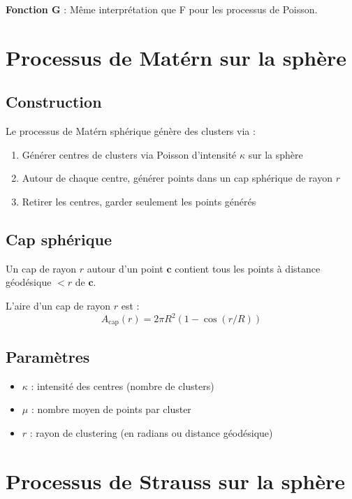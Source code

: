 \textbf{Fonction G} : Même interprétation que F pour les processus de Poisson.

\section{Processus de Matérn sur la sphère}

\subsection{Construction}

Le processus de Matérn sphérique génère des clusters via :

\begin{enumerate}
    \item Générer centres de clusters via Poisson d'intensité $\kappa$ sur la sphère
    \item Autour de chaque centre, générer points dans un cap sphérique de rayon $r$
    \item Retirer les centres, garder seulement les points générés
\end{enumerate}

\subsection{Cap sphérique}

Un cap de rayon $r$ autour d'un point $\mathbf{c}$ contient tous les points à distance géodésique $< r$ de $\mathbf{c}$.

L'aire d'un cap de rayon $r$ est :
\[
A_{\text{cap}}(r) = 2\pi R^2 (1 - \cos(r/R))
\]

\subsection{Paramètres}

\begin{itemize}
    \item $\kappa$ : intensité des centres (nombre de clusters)
    \item $\mu$ : nombre moyen de points par cluster
    \item $r$ : rayon de clustering (en radians ou distance géodésique)
\end{itemize}

\section{Processus de Strauss sur la sphère}

